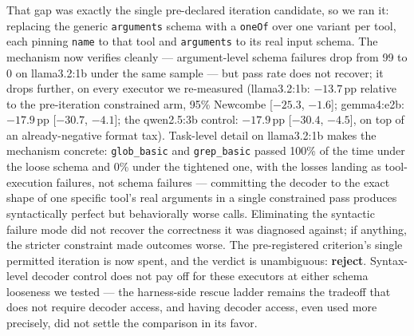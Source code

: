 \documentclass[smallcondensed,natbib]{svjour3}
\begin{document}
That gap was exactly the single pre-declared iteration candidate, so we
ran it: replacing the generic \texttt{arguments} schema with a
\texttt{oneOf} over one variant per tool, each pinning \texttt{name} to
that tool and \texttt{arguments} to its real input schema. The
mechanism now verifies cleanly --- argument-level schema failures drop
from 99 to 0 on llama3.2:1b under the same sample --- but pass rate does
not recover; it drops further, on every executor we re-measured
(llama3.2:1b: $-13.7$\,pp relative to the pre-iteration constrained arm,
95\% Newcombe [$-25.3$, $-1.6$]; gemma4:e2b: $-17.9$\,pp [$-30.7$,
$-4.1$]; the qwen2.5:3b control: $-17.9$\,pp [$-30.4$, $-4.5$], on top of
an already-negative format tax). Task-level detail on llama3.2:1b makes
the mechanism concrete: \texttt{glob\_basic} and \texttt{grep\_basic}
passed 100\% of the time under the loose schema and 0\% under the
tightened one, with the losses landing as tool-execution failures, not
schema failures --- committing the decoder to the exact shape of one
specific tool's real arguments in a single constrained pass produces
syntactically perfect but behaviorally worse calls. Eliminating the
syntactic failure mode did not recover the correctness it was diagnosed
against; if anything, the stricter constraint made outcomes worse. The
pre-registered criterion's single permitted iteration is now spent, and
the verdict is unambiguous: \textbf{reject}. Syntax-level decoder
control does not pay off for these executors at either schema looseness
we tested --- the harness-side rescue ladder remains the tradeoff that
does not require decoder access, and having decoder access, even used
more precisely, did not settle the comparison in its favor.
\end{document}
